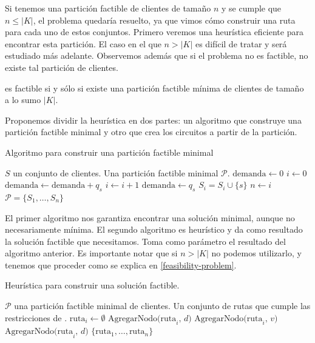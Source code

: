 Si tenemos una partición factible de clientes de tamaño $n$ y se cumple que $n \leq |K|$, el problema quedaría resuelto, ya que vimos cómo construir una ruta para cada uno de estos conjuntos. Primero veremos una heurística eficiente para encontrar esta partición. El caso en el que $n > |K|$ es difícil de tratar y será estudiado más adelante. Observemos además que si el problema no es factible, no existe tal partición de clientes.

\begin{observation}
    \label{obs:heuristic-observation}
     es factible si y sólo si existe una partición factible mínima de clientes de tamaño a lo sumo $|K|$.
\end{observation}

Proponemos dividir la heurística en dos partes: un algoritmo que construye una partición factible minimal y otro que crea los circuitos a partir de la partición.

\begin{algorithm}[H]
  \caption{Algoritmo para construir una partición factible minimal}
  \label{al:feasible_minimal_partition_algorithm}
  \begin{algorithmic}[1]
  	\Require $S$ un conjunto de clientes.
  	\Ensure Una partición factible minimal $\mathscr{P}$.
        \State $\text{demanda} \gets 0$
        \State $i \gets 0$
            \State $\text{demanda} \gets \text{demanda} + q_s$
                \State $i \gets i + 1$
                \State $\text{demanda} \gets q_s$
            \EndIf
            \State $S_i = S_i \cup \{s\}$
        \EndFor
        \State $n \gets i$
	\Return $\mathscr{P} = \{S_1, \dots, S_n\}$
  \end{algorithmic}
\end{algorithm}

El primer algoritmo nos garantiza encontrar una solución minimal, aunque no necesariamente mínima. El segundo algoritmo es heurístico y da como resultado la solución factible que necesitamos. Toma como parámetro el resultado del algoritmo anterior. Es importante notar que si $n > |K|$ no podemos utilizarlo, y tenemos que proceder como se explica en \ref{feasibility-problem}.

\begin{algorithm}[H]
  \caption{Heurística para construir una solución factible.}
  \label{al:feasible_solution_heuristic}
  \begin{algorithmic}[1]
  	\Require $\mathscr{P}$ una partición factible minimal de clientes.
  	\Ensure Un conjunto de rutas que cumple las restricciones de .
            \State $\text{ruta}_i \gets \emptyset$
            \State $\text{AgregarNodo(ruta}_i \text{, } d \text{)}$
                \State $\text{AgregarNodo(ruta}_i \text{, } v \text{)}$
            \EndFor
            \State $\text{AgregarNodo(ruta}_i \text{, } d \text{)}$
        \EndFor
	\Return $\{\text{ruta}_1, \dots, \text{ruta}_n\}$
  \end{algorithmic}
\end{algorithm}

